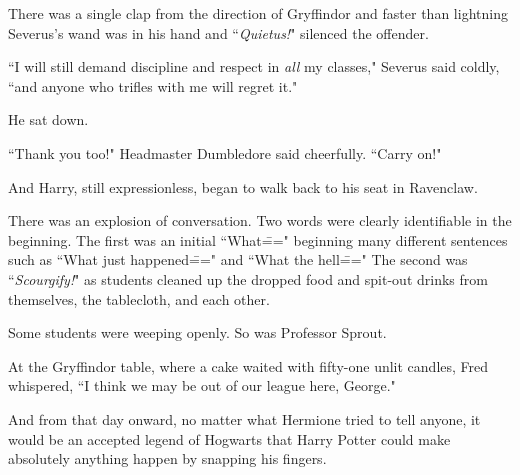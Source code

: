 There was a single clap from the direction of Gryffindor and faster than lightning Severus's wand was in his hand and ``\emph{Quietus!}" silenced the offender.

``I will still demand discipline and respect in \emph{all} my classes," Severus said coldly, ``and anyone who trifles with me will regret it."

He sat down.

``Thank you too!" Headmaster Dumbledore said cheerfully. ``Carry on!"

And Harry, still expressionless, began to walk back to his seat in Ravenclaw.

There was an explosion of conversation. Two words were clearly identifiable in the beginning. The first was an initial ``What\===" beginning many different sentences such as ``What just happened\===" and ``What the hell\===" The second was ``\emph{Scourgify!}" as students cleaned up the dropped food and spit-out drinks from themselves, the tablecloth, and each other.

Some students were weeping openly. So was Professor Sprout.

At the Gryffindor table, where a cake waited with fifty-one unlit candles, Fred whispered, ``I think we may be out of our league here, George."

And from that day onward, no matter what Hermione tried to tell anyone, it would be an accepted legend of Hogwarts that Harry Potter could make absolutely anything happen by snapping his fingers.

